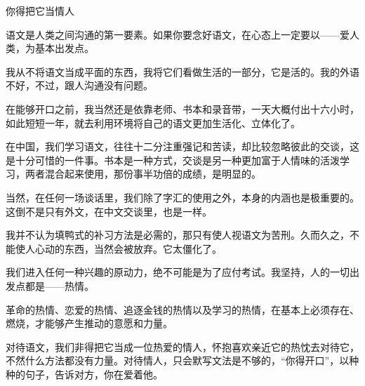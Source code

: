 \begin{center}
    \par 你得把它当情人
\end{center}
\par {}
\par 语文是人类之间沟通的第一要素。如果你要念好语文，在心态上一定要以——爱人类，为基本出发点。
\par 我从不将语文当成平面的东西，我将它们看做生活的一部分，它是活的。我的外语不好，不过，跟人沟通没有问题。
\par 在能够开口之前，我当然还是依靠老师、书本和录音带，一天大概付出十六小时，如此短短一年，就去利用环境将自己的语文更加生活化、立体化了。
\par 在中国，我们学习语文，往往十二分注重强记和苦读，却比较忽略彼此的交谈，这是十分可惜的一件事。书本是一种方式，交谈是另一种更加富于人情味的活泼学习，两者混合起来使用，那份事半功倍的成绩，是明显的。
\par 当然，在任何一场谈话里，我们除了字汇的使用之外，本身的内涵也是极重要的。这倒不是只有外文，在中文交谈里，也是一样。
\par 我并不认为填鸭式的补习方法是必需的，那只有使人视语文为苦刑。久而久之，不能使人心动的东西，当然会被放弃。它太僵化了。
\par 我们进入任何一种兴趣的原动力，绝不可能是为了应付考试。我坚持，人的一切出发点都是——热情。
\par 革命的热情、恋爱的热情、追逐金钱的热情以及学习的热情，在基本上必须存在、燃烧，才能够产生推动的意愿和力量。
\par 对待语文，我们非得把它当成一位热爱的情人，怀抱喜欢亲近它的热忱去对待它，不然什么方法都没有力量。对待情人，只会默写文法是不够的，“你得开口”，以种种的句子，告诉对方，你在爱着他。
\par {}




